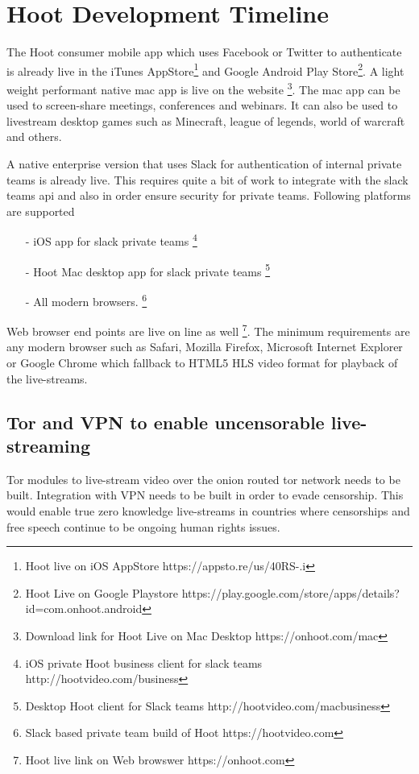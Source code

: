 \documentclass{article}
\begin{document}
\section{Hoot Development Timeline}
The Hoot consumer mobile app which uses Facebook or Twitter to authenticate is already live in the iTunes AppStore\footnote{Hoot live on iOS AppStore https://appsto.re/us/40RS-.i} and Google Android Play Store\footnote{Hoot Live on Google Playstore https://play.google.com/store/apps/details?id=com.onhoot.android}.
A light weight performant native  mac app is live on
the website \footnote{Download link for Hoot Live on Mac Desktop https://onhoot.com/mac}. The mac app can be used to screen-share meetings, conferences and webinars. It can also be used
to livestream desktop games such as Minecraft, league of legends,
world of warcraft and others.

A native enterprise version that uses Slack for authentication of
internal private teams is already live.
 This requires quite a bit of work to integrate with the slack teams api and also in order  ensure security for private teams. Following platforms are supported
\begin{itemize}

\item[-]iOS app for slack private teams \footnote{ iOS private Hoot business client for slack teams http://hootvideo.com/business}
\item[-]Hoot Mac desktop app for slack private teams \footnote{Desktop Hoot client for Slack teams http://hootvideo.com/macbusiness}
\item[-]All modern browsers. \footnote{Slack based private team build of Hoot https://hootvideo.com}
\end{itemize}

Web browser end points are live on line as well
\footnote{Hoot live link on Web browswer https://onhoot.com}. The minimum requirements are any modern
browser such as Safari, Mozilla Firefox, Microsoft Internet Explorer
or Google Chrome which fallback to HTML5 HLS video format for playback
of the live-streams.


\subsection{Tor and VPN to enable uncensorable live-streaming }
Tor modules to live-stream video over the onion routed tor network needs
to be built. Integration with VPN needs to be built in order to evade censorship. This would enable true zero knowledge live-streams in
countries where censorships and free speech continue to be ongoing
human rights issues.
\end{document}
